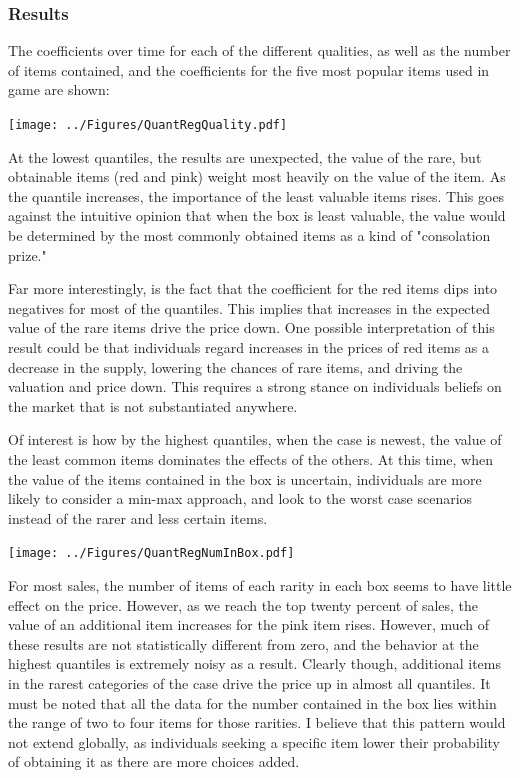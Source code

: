 \documentclass[12pt, letterpaper]{paper}
\begin{document}
\subsubsection{Results}
\label{sec-4-6-3}

The coefficients over time for each of the different qualities, as
well as the number of items contained, and the coefficients for the five
most popular items used in game are shown:

\texttt{[image: ../Figures/QuantRegQuality.pdf]}

At the lowest quantiles, the results are unexpected, the value of the
rare, but obtainable items (red and pink) weight most heavily on the
value of the item. As the quantile increases, the importance
of the least valuable items rises. This goes against the intuitive
opinion that when the box is least valuable, the value would be
determined by the most commonly obtained items as a kind of
"consolation prize." 

Far more interestingly, is the fact that the coefficient for the red
items dips into negatives for most of the quantiles. This implies that
increases in the expected value of the rare items drive the price
down. One possible interpretation of this result could be that
individuals regard increases in the prices of red items as a decrease
in the supply, lowering the chances of rare items, and driving the
valuation and price down. This requires a strong stance on individuals
beliefs on the market that is not substantiated anywhere. 

Of interest is how by the highest quantiles, when the case is newest,
the value of the least common items dominates the effects of the
others. At this time, when the value of the items contained in the box
is uncertain, individuals are more likely to consider a min-max
approach, and look to the worst case scenarios instead of the rarer
and less certain items.


\texttt{[image: ../Figures/QuantRegNumInBox.pdf]}

For most sales, the number of items of each rarity in each box seems
to have little effect on the price. However, as we reach the top
twenty percent of sales, the value of an additional item increases for
the pink item rises. However, much of these results are not
statistically different from zero, and the behavior at the highest
quantiles is extremely noisy as a result.  Clearly though, additional
items in the rarest categories of the case drive the price up in
almost all quantiles. It must be noted that all the data for the
number contained in the box lies within the range of two to four items
for those rarities. I believe that this pattern would not extend
globally, as individuals seeking a specific item lower their
probability of obtaining it as there are more choices added.
\end{document}
